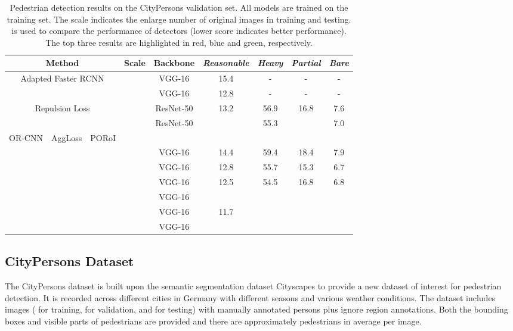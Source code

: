 \documentclass[runningheads]{llncs}
\begin{document}
\begin{table*}[t]
\centering
\caption{Pedestrian detection results on the CityPersons validation set. All models are trained on the training set. The scale indicates the enlarge number of original images in training and testing.  is used to compare the performance of detectors (lower score indicates better performance). The top three results are highlighted in red, blue and green, respectively. }
\small \setlength{\tabcolsep}{3.5pt}
\begin{tabular}{c|cc|c|c|c|ccc}
\toprule[1.5pt]
\multicolumn{3}{c|}{Method}   &Scale &Backbone &{\em Reasonable} &{\em Heavy} &{\em Partial} &{\em Bare} \\
\hline
\multicolumn{3}{c|}{\multirow{2}{*}{Adapted Faster RCNN \cite{DBLP:conf/cvpr/ZhangBS17}}}                           & &VGG-16 &15.4 &- &- &- \\
\multicolumn{3}{c|}{}                                                                                                                              & &VGG-16 &12.8 &- &- &- \\
\multicolumn{3}{c|}{\multirow{2}{*}{Repulsion Loss \cite{DBLP:journals/corr/abs-1711-07752}}}     & &ResNet-50 &13.2 &56.9 &16.8 &7.6 \\
\multicolumn{3}{c|}{}                                                                                                                & &ResNet-50 &\color{green}{11.6} &55.3 &\color{green}{14.8} &7.0 \\
\hline
\hline
\multirow{7}{*}{OR-CNN} &AggLoss &PORoI & & & & & &  \\
\cline{2-3}
&  & & &VGG-16 &14.4 &59.4 &18.4 &7.9  \\
& &  & &VGG-16 &12.8 &55.7 &15.3 &6.7  \\
&  & & &VGG-16 &12.5 &54.5 &16.8 &6.8  \\
& &  & &VGG-16 &\color{blue}{11.4} &\color{blue}{52.6} &\color{blue}{13.8} &\color{blue}{6.2} \\
& &  & &VGG-16 &11.7 &\color{green}{53.0} &\color{green}{14.8} &\color{green}{6.6} \\

& &  & &VGG-16 &\color{red}{11.0} &\color{red}{51.3} &\color{red}{13.7} &\color{red}{5.9} \\
\bottomrule[1.5pt]
\end{tabular}
\label{tab:cityperson-val}
\end{table*}


\subsection{CityPersons Dataset}
The CityPersons dataset \cite{DBLP:conf/cvpr/ZhangBS17} is built upon the semantic segmentation dataset Cityscapes \cite{DBLP:conf/cvpr/CordtsORREBFRS16} to provide a new dataset of interest for pedestrian detection. It is recorded across  different cities in Germany with  different seasons and various weather conditions. The dataset includes  images ( for training,  for validation, and  for testing) with  manually annotated persons plus  ignore region annotations. Both the bounding boxes and visible parts of pedestrians are provided and there are approximately  pedestrians in average per image.
\end{document}
